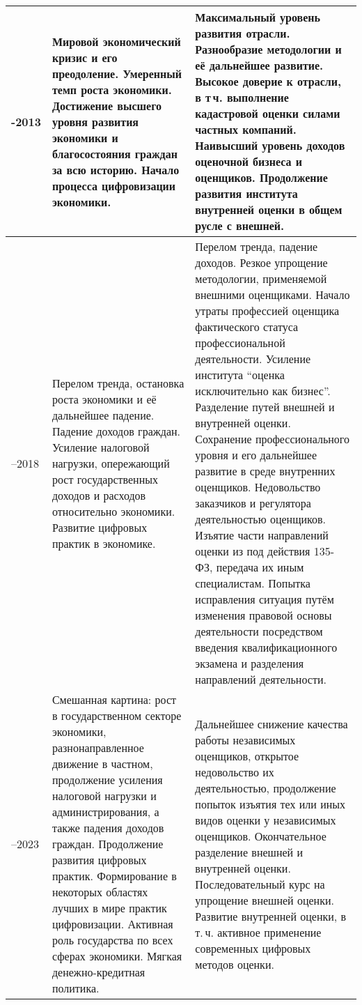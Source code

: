 \documentclass[12pt]{scrartcl}
\begin{document}
\begin{table}[h]
\begin{tabularx}{\textwidth}{>{\hsize=0.23\hsize}X >{\hsize=0.9\hsize}X X}
		\hline
		2008-2013 & Мировой экономический кризис и его преодоление. Умеренный темп роста экономики. Достижение высшего уровня развития экономики и благосостояния граждан за всю историю. Начало процесса цифровизации экономики. & Максимальный уровень развития отрасли. Разнообразие методологии и её дальнейшее развитие. Высокое доверие к отрасли, в т\,ч. выполнение кадастровой оценки силами частных компаний. Наивысший уровень доходов оценочной бизнеса и оценщиков. Продолжение развития института внутренней оценки в общем русле с внешней.\\
		\hline
		2013--2018 & Перелом тренда, остановка роста экономики и её дальнейшее падение. Падение доходов граждан. Усиление налоговой нагрузки, опережающий рост государственных доходов и расходов относительно экономики. Развитие цифровых практик в экономике. & Перелом тренда, падение доходов. Резкое упрощение методологии, применяемой внешними оценщиками. Начало утраты профессией оценщика фактического статуса профессиональной деятельности. Усиление института ``оценка исключительно как бизнес''. Разделение путей внешней и внутренней оценки. Сохранение профессионального уровня и его дальнейшее развитие в среде внутренних оценщиков. Недовольство заказчиков и регулятора деятельностью оценщиков. Изъятие части направлений оценки из под действия 135-ФЗ, передача их иным специалистам. Попытка исправления ситуация путём изменения правовой основы деятельности посредством введения квалификационного экзамена и разделения направлений деятельности.\\
		\hline
		2018--2023 & Смешанная картина: рост в государственном секторе экономики, разнонаправленное движение в частном, продолжение усиления налоговой нагрузки и администрирования, а также падения доходов граждан. Продолжение развития цифровых практик. Формирование в некоторых областях лучших в мире практик цифровизации. Активная роль государства по всех сферах экономики. Мягкая денежно-кредитная политика. & Дальнейшее снижение качества работы независимых оценщиков, открытое недовольство их деятельностью, продолжение попыток изъятия тех или иных видов оценки у независимых оценщиков. Окончательное разделение внешней и внутренней оценки. Последовательный курс на упрощение внешней оценки. Развитие внутренней оценки, в т.\,ч. активное применение современных цифровых методов оценки. \\
		\hline

\end{tabularx}
\end{table}
\end{document}

